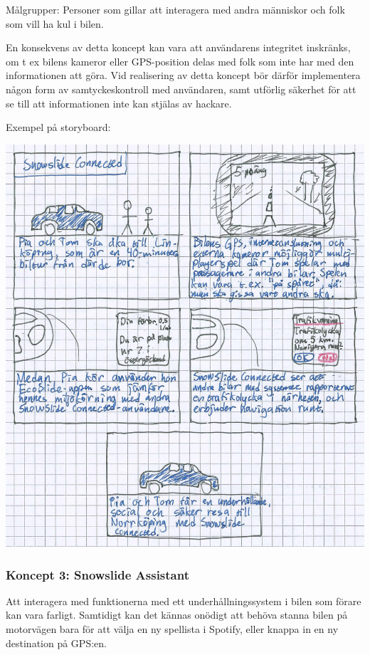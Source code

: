 \documentclass[a4paper,12pt,titlepage]{article}
\begin{document}
Målgrupper: Personer som gillar att interagera med andra människor och folk som
vill ha kul i bilen.

En konsekvens av detta koncept kan vara att användarens integritet inskränks,
om t ex bilens kameror eller GPS-position delas med folk som inte har med den
informationen att göra. Vid realisering av detta koncept bör därför
implementera någon form av samtyckeskontroll med användaren, samt utförlig
säkerhet för att se till att informationen inte kan stjälas av hackare.

\newpage
Exempel på storyboard:

\begin{center}
\includegraphics[width=15cm]{images/connected.jpg}
\end{center}

\newpage
\subsubsection*{Koncept 3: Snowslide Assistant}

Att interagera med funktionerna med ett underhållningssystem i bilen som förare
kan vara farligt. Samtidigt kan det kännas onödigt att behöva stanna bilen på
motorvägen bara för att välja en ny spellista i Spotify, eller knappa in en ny
destination på GPS:en.
\end{document}
